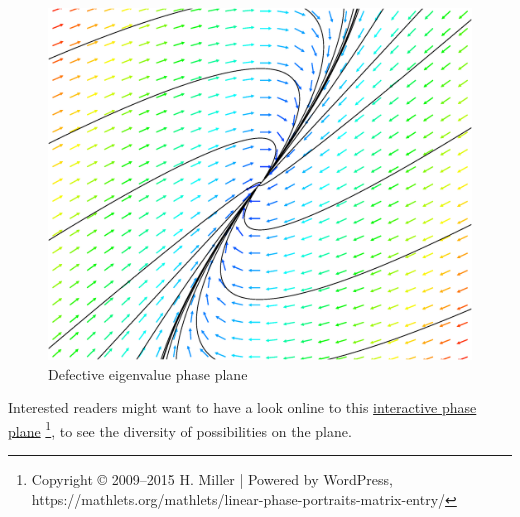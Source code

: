 \begin{exemple}
\begin{figure}[H]
    \includegraphics[scale=0.3]{images/defective.eps}
    \caption{Defective eigenvalue phase plane}
    \label{fig:defective}
\end{figure}
\end{exemple}
\begin{remarque}
Interested readers might want to have a look online to this 
\href{ https://mathlets.org/mathlets/linear-phase-portraits-matrix-entry/}{interactive phase plane}
\footnote{Copyright © 2009--2015 H. Miller | Powered by WordPress,  https://mathlets.org/mathlets/linear-phase-portraits-matrix-entry/ },
to see the diversity of possibilities on the plane.
\end{remarque}

